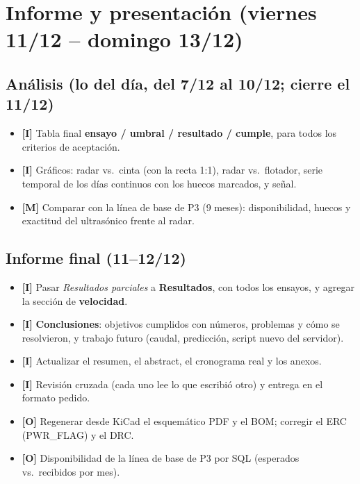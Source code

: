 \documentclass[11pt,a4paper]{article}
\newcommand{\imp}{\textcolor{rojo}{\textbf{[I]}}}
\newcommand{\mej}{\textcolor{ambar}{\textbf{[M]}}}
\newcommand{\opc}{\textcolor{gris}{\textbf{[O]}}}
\begin{document}
\section{Informe y presentación (viernes 11/12 -- domingo 13/12)}

\subsection{Análisis (lo del día, del 7/12 al 10/12; cierre el 11/12)}
\begin{itemize}
  \item \imp{} Tabla final \textbf{ensayo / umbral / resultado / cumple}, para todos los criterios
        de aceptación.
  \item \imp{} Gráficos: radar vs.\ cinta (con la recta 1:1), radar vs.\ flotador, serie temporal de
        los días continuos con los huecos marcados, y señal.
  \item \mej{} Comparar con la línea de base de P3 (9 meses): disponibilidad, huecos y exactitud del
        ultrasónico frente al radar.
\end{itemize}

\subsection{Informe final (11--12/12)}
\begin{itemize}
  \item \imp{} Pasar \emph{Resultados parciales} a \textbf{Resultados}, con todos los ensayos, y
        agregar la sección de \textbf{velocidad}.
  \item \imp{} \textbf{Conclusiones}: objetivos cumplidos con números, problemas y cómo se
        resolvieron, y trabajo futuro (caudal, predicción, script nuevo del servidor).
  \item \imp{} Actualizar el resumen, el abstract, el cronograma real y los anexos.
  \item \imp{} Revisión cruzada (cada uno lee lo que escribió otro) y entrega en el formato pedido.
  \item \opc{} Regenerar desde KiCad el esquemático PDF y el BOM; corregir el ERC (PWR\_FLAG) y
        el DRC.
  \item \opc{} Disponibilidad de la línea de base de P3 por SQL (esperados vs.\ recibidos por mes).
\end{itemize}
\end{document}
